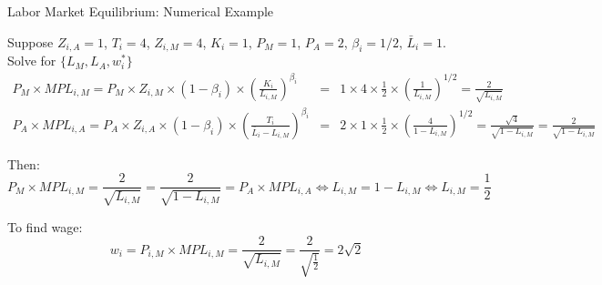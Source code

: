 \documentclass[notes,11pt, aspectratio=169, xcolor=table]{beamer}
\newenvironment{wideitemize}{\itemize\addtolength{\itemsep}{10pt}}{\enditemize}
\begin{document}
\begin{frame}{Labor Market Equilibrium: Numerical Example}
    \begin{wideitemize}
        \item Suppose $Z_{i,A} = 1$, $T_i = 4$, $Z_{i,M} = 4$, $K_i = 1$, $P_M=1$, $P_A=2$, $\beta_i=1/2$, $\bar{L}_i=1$. Solve for $\{L_M,L_A,w_{i}^*\}$
    { \scriptsize
    \begin{eqnarray*}
        P_{M} \times  MPL_{i,M} = P_{M} \times  Z_{i,M} \times (1-\beta_i) \times \left( \frac{K_{i}}{L_{i,M}} \right)^{\beta_i} &=& 1 \times  4 \times \frac{1}{2} \times \left( \frac{1}{L_{i,M}} \right)^{1/2} =  \frac{2}{\sqrt{ L_{i,M}}} \\
        P_{A} \times  MPL_{i,A} = P_{A} \times  Z_{i,A} \times (1-\beta_i) \times \left( \frac{T_{i}}{\bar{L}_i - L_{i,M}} \right)^{\beta_i} &=& 2 \times  1 \times \frac{1}{2} \times \left( \frac{4}{1 - L_{i,M}} \right)^{1/2} =  \frac{\sqrt{4}}{\sqrt{1 - L_{i,M}}} =  \frac{2}{\sqrt{1 - L_{i,M}}} 
    \end{eqnarray*}
    }
    \item<2-> Then:
{ \footnotesize
    \begin{equation*}
         P_{M} \times  MPL_{i,M} = \frac{2}{\sqrt{ L_{i,M}}} = \frac{2}{\sqrt{1 - L_{i,M}}} = P_{A} \times  MPL_{i,A} \iff L_{i,M} = 1 - L_{i,M} \iff L_{i,M} = \frac{1}{2}   
    \end{equation*}
     }

    \item<3-> To find wage:
    \begin{equation*}
        w_i = P_{i,M} \times MPL_{i,M} = \frac{2}{\sqrt{ L_{i,M}}}  = \frac{2}{\sqrt{  \frac{1}{2} }} = 2\sqrt{2}
    \end{equation*} 
    \end{wideitemize}

\end{frame}
\end{document}
